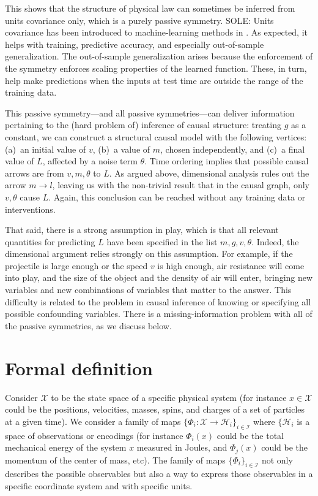 \documentclass{article}
\theoremstyle{plain}
\theoremstyle{definition}
\theoremstyle{remark}
\begin{document}
This shows that the structure of physical law can sometimes be inferred from units covariance only, which is a purely passive symmetry.
SOLE: Units covariance has been introduced to machine-learning methods in \cite{villar2022dimensionless, 
SOLE-OTHERS}.
As expected, it helps with training, predictive accuracy, and especially out-of-sample generalization.
The out-of-sample generalization arises because the enforcement of the symmetry enforces scaling properties of the learned function.
These, in turn, help make predictions when the inputs at test time are outside the range of the training data.

This passive symmetry---and all passive symmetries---can deliver information pertaining to the (hard problem of) inference of causal structure:
treating $g$ as a constant, we can construct a structural causal model with the following vertices: (a)~an initial value of $v$, (b)~a value of $m$, chosen independently, and (c)~a final value of $L$, affected by a noise term $\theta$.
Time ordering implies that possible causal arrows are from $v, m, \theta$ to $L$.
As argued above, dimensional analysis rules out the arrow $m\to l$, leaving us with the non-trivial result that in the causal graph, only $v,\theta$ cause $L$.
Again, this conclusion can be reached without any training data or interventions.

That said, there is a strong assumption in play, which is that all relevant quantities for predicting $L$ have been specified in the list $m, g, v, \theta$.
Indeed, the dimensional argument relies strongly on this assumption.
For example, if the projectile is large enough or the speed $v$ is high enough, air resistance will come into play, and the size of the object and the density of air will enter, bringing new variables and new combinations of variables that matter to the answer.
This difficulty is related to the problem in causal inference of knowing or specifying all possible confounding variables.
There is a missing-information problem with all of the passive symmetries, as we discuss below.

\section{Formal definition}\label{sec:definitions}

Consider $\mathcal X$ to be the state space of a specific physical system (for instance $x\in \mathcal X$ could be the positions, velocities, masses, spins, and charges of a set of particles at a given time). 
We consider a family of maps $\{\Phi_i: \mathcal X \to \mathcal H_i\}_{i\in \mathcal I}$ where $\{\mathcal H_i$ is a space of observations or encodings (for instance $\Phi_i(x)$ could be the total mechanical energy of the system $x$ measured in Joules, and $\Phi_j(x)$ could be the momentum of the center of mass, etc).
The family of maps $\{\Phi_i\}_{i\in \mathcal I}$ not only describes the possible observables but also a way to express those observables in a specific coordinate system and with specific units. 
\end{document}
